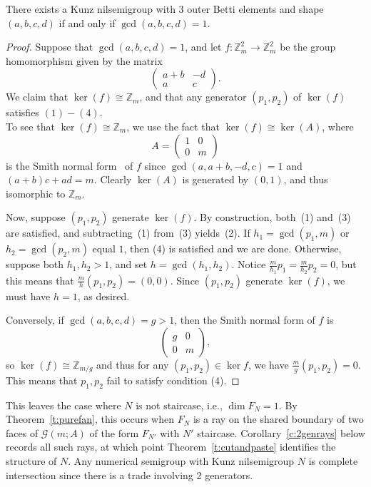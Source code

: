 \documentclass[ALCO, Unicode]{cedram}
\newcommand\ZZ{\mathbb{Z}}
\begin{document}
\begin{thm}\label{t:2dstaircasecondition}
There exists a Kunz nilsemigroup with 3 outer Betti elements and shape $(a,b,c,d)$ if and only if $\gcd(a,b,c,d) = 1$. 
\end{thm}

\begin{proof}
Suppose that $\gcd(a,b,c,d) = 1$, and let $f : \ZZ_m^2 \to \ZZ_m^2$ be the group homomorphism given by the matrix
\[
\begin{pmatrix}
a+b & -d \\ a & c
\end{pmatrix}.
\] 
We claim that $\ker(f) \cong \ZZ_m$, and that any generator $(p_1,p_2)$ of $\ker(f)$ satisfies $(1)-(4)$. \\
To see that $\ker(f) \cong \ZZ_m$, we use the fact that $\ker(f) \cong \ker(A)$, where 
\[
A = \begin{pmatrix}
1 & 0 \\ 0 & m
\end{pmatrix}
\]
is the Smith normal form~\cite{snf} of $f$ since $\gcd(a,a+b,-d,c) = 1$ and $(a+b)c + ad = m$.  Clearly $\ker(A)$ is generated by $(0,1)$, and thus isomorphic to $\ZZ_m$.  

Now, suppose $(p_1,p_2)$ generate $\ker(f)$.  By construction, both~(1) and~(3) are satisfied, and subtracting~(1) from~(3) yields~(2).  If $h_1 = \gcd(p_1,m)$ or $h_2 = \gcd(p_2,m)$ equal $1$, then (4) is satisfied and we are done. Otherwise, suppose both $h_1,h_2 > 1$, and set $h = \gcd(h_1,h_2)$. Notice $\tfrac{m}{h_1}p_1 = \tfrac{m}{h_2}p_2 = 0$, but this means that $\tfrac{m}{h}(p_1,p_2) = (0,0)$. Since $(p_1,p_2)$ generate $\ker(f)$, we must have $h = 1$, as desired.  

Conversely, if $\gcd(a,b,c,d) = g > 1$, then the Smith normal form of $f$ is 
\[
\begin{pmatrix}
g & 0 \\ 0 & m
\end{pmatrix},
\]
so $\ker(f) \cong \ZZ_{m/g}$ and thus for any $(p_1,p_2) \in \ker f$, we have $\tfrac{m}{g}(p_1,p_2) = 0$.  This means that $p_1,p_2$ fail to satisfy condition (4).
\end{proof}


This leaves the case where $N$ is not staircase, i.e., $\dim F_N = 1$.  By Theorem~\ref{t:purefan}, this occurs when $F_N$ is a ray on the shared boundary of two faces of $\mathcal G(m;A)$ of the form $F_{N'}$ with $N'$ staircase.  Corollary~\ref{c:2genrays} below records all such rays, at which point Theorem~\ref{t:cutandpaste} identifies the structure of $N$.  Any numerical semigroup with Kunz nilsemigroup $N$ is complete intersection since there is a trade involving 2 generators.  
\end{document}
